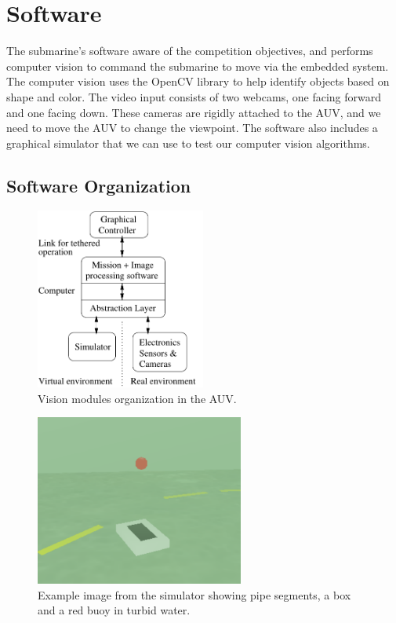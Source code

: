 \section{Software}

The submarine's software aware of the competition objectives, and performs computer vision to
command the submarine to move via the embedded system.
The computer vision uses the OpenCV library to help identify objects based on shape and color.
The video input consists of two webcams, one facing forward and one facing down.
These cameras are rigidly attached to the AUV, and we need to move the AUV to change the viewpoint.
The software also includes a graphical simulator that we can use to test our computer vision algorithms.

\subsection{Software Organization}
\label{gui}


\begin{figure}
\begin{center}
 \includegraphics[width=2.2in]{fig/vision}
\caption{Vision modules organization in the AUV.}\label{vision}
\end{center}
\end{figure}


\begin{figure}
\begin{center}
 \includegraphics[width=2.7in]{fig/sim}
\caption{Example image from the simulator showing pipe segments, a box
  and a red buoy in turbid water.}\label{sim}
\end{center}
\end{figure}

